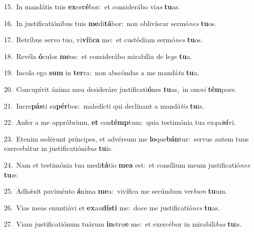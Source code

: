 {\numbfont\textcolor{\numbcolor}{15.}}~In mandátis tuis \textbf{ex}\-er\-\textbf{cé}\-bor:~\star et considerábo vi\textit{as} \textbf{tu}\-as.\par
{\numbfont\textcolor{\numbcolor}{16.}}~In justificatiónibus tuis \textbf{me}\-di\-\textbf{tá}\-bor:~\star non oblivíscar sermó\textit{nes} \textbf{tu}\-os.\par
{\numbfont\textcolor{\numbcolor}{17.}}~Retríbue servo tuo, vi\-\textbf{ví}\-fi\textbf{ca} me:~\star et custódiam sermó\textit{nes} \textbf{tu}\-os.\par
{\numbfont\textcolor{\numbcolor}{18.}}~Revéla \textbf{ó}\-culos \textbf{me}\-os:~\star et considerábo mirabília de le\textit{ge} \textbf{tu}\-a.\par
{\numbfont\textcolor{\numbcolor}{19.}}~Incola ego \textbf{sum} in \textbf{ter}\-ra:~\star non abscóndas a me mandá\textit{ta} \textbf{tu}\-a.\par
{\numbfont\textcolor{\numbcolor}{20.}}~Concupívit ánima mea desideráre justificati\-\textbf{ó}\-nes \textbf{tu}\-as,~\star in om\textit{ni} \textbf{tém}\-pore.\par
{\numbfont\textcolor{\numbcolor}{21.}}~Incre\-\textbf{pás}\-ti su\-\textbf{pér}\-bos:~\star maledícti qui declínant a mandá\textit{tis} \textbf{tu}\-is.\par
{\numbfont\textcolor{\numbcolor}{22.}}~Aufer a me oppróbrium, \textbf{et} con\-\textbf{témp}\-tum:~\star quia testimónia tua ex\-\textit{qui}\-\textbf{sí}vi.\par
{\numbfont\textcolor{\numbcolor}{23.}}~Etenim sedérunt príncipes, et advérsum me \textbf{lo}\-que\-\textbf{bán}\-tur:~\star servus autem tuus exercebátur in justificatióni\textit{bus} \textbf{tu}\-is.\par
{\numbfont\textcolor{\numbcolor}{24.}}~Nam et testimónia tua medi\-\textbf{tá}\-tio \textbf{me}\-\textbf{a} est:~\star et consílium meum justificatió\textit{nes} \textbf{tu}\-æ.\par
{\numbfont\textcolor{\numbcolor}{25.}}~Adhǽsit paviménto \textbf{á}\-nima \textbf{me}\-a:~\star vivífica me secúndum ver\textit{bum} \textbf{tu}\-um.\par
{\numbfont\textcolor{\numbcolor}{26.}}~Vias meas enuntiávi et \textbf{ex}\-au\-\textbf{dís}\-\textbf{ti} me:~\star doce me justificatió\textit{nes} \textbf{tu}\-as.\par
{\numbfont\textcolor{\numbcolor}{27.}}~Viam justificatiónum tuárum \textbf{ín}\-stru\textbf{e} me:~\star et exercébor in mirabíli\textit{bus} \textbf{tu}\-is.\par
